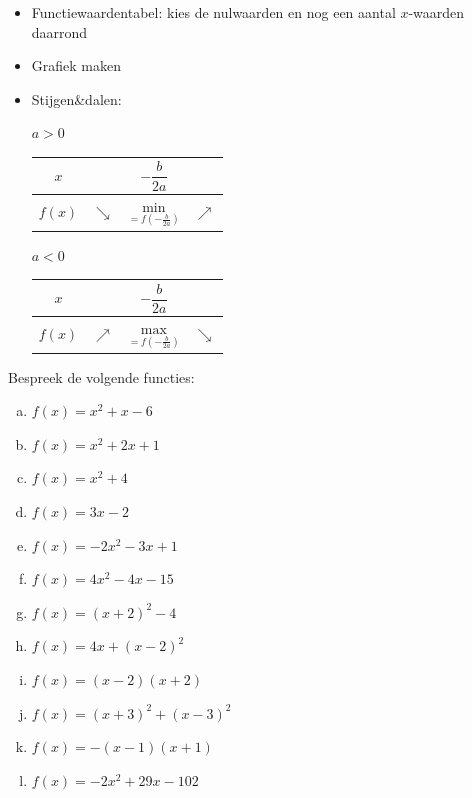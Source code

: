 \documentclass[12pt]{article}
\begin{document}
\begin{theorie}
\begin{mdframed}
\begin{itemize}
\begin{itemize}
    \end{itemize}
  \item Functiewaardentabel: kies de nulwaarden en nog een aantal $x$-waarden daarrond
  \item Grafiek maken
  \item Stijgen\&dalen:\\
    \begin{minipage}{0.45\textwidth}
      \centering $a>0$\\
      \begin{tabular}{c|lcr}
        $x$ &  & $-\dfrac{b}{2a}$ & \\[0.1cm]
        \hline
        $f(x)$ & $\searrow$ & $\underset{=f(-\frac{b}{2a})}{\mbox{min}}$ & $\nearrow$
      \end{tabular}
    \end{minipage}
    \begin{minipage}{0.45\textwidth}
      \centering $a<0$\\
      \begin{tabular}{c|lcr}
        $x$ &  & $-\dfrac{b}{2a}$ & \\[0.1cm]
        \hline
        $f(x)$ & $\nearrow$ & $\underset{=f(-\frac{b}{2a})}{\mbox{max}}$ & $\searrow$
      \end{tabular}
    \end{minipage}
  \end{itemize}
\end{mdframed}

\end{theorie}

\begin{oefening}
  Bespreek de volgende functies:
  \begin{multicols}{2}
  \begin{enumerate}[(a)]
  \item $f(x)=x^2+x-6$
  \item $f(x)=x^2+2x+1$
  \item $f(x)=x^2+4$
  \item $f(x)=3x-2$
  \item $f(x)=-2x^2-3x+1$
  \item $f(x)=4x^2-4x-15$
  \item $f(x)=(x+2)^2-4$
  \item $f(x)=4x+(x-2)^2$
  \item $f(x)=(x-2)(x+2)$
  \item $f(x)=(x+3)^2+(x-3)^2$
  \item $f(x)=-(x-1)(x+1)$
  \item $f(x)=-2x^2+29x-102$
  \end{enumerate}
  \end{multicols}
\end{oefening}
\end{document}
